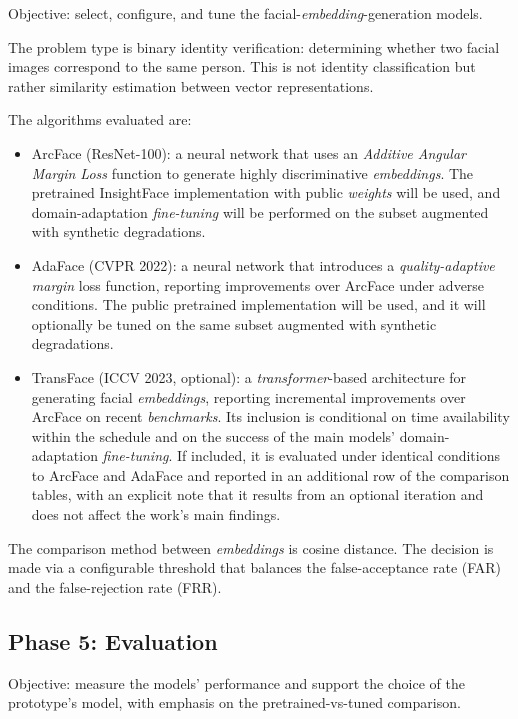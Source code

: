 \documentclass[
  11pt, %
]{charter}
\begin{document}
Objective: select, configure, and tune the facial-\textit{embedding}-generation models.

The problem type is binary identity verification: determining whether two facial images correspond to the same person. This is not identity classification but rather similarity estimation between vector representations.

The algorithms evaluated are:

\begin{itemize}
  \item ArcFace (ResNet-100): a neural network that uses an \textit{Additive Angular Margin Loss} function to generate highly discriminative \textit{embeddings}. The pretrained InsightFace implementation with public \textit{weights} will be used, and domain-adaptation \textit{fine-tuning} will be performed on the subset augmented with synthetic degradations.
  \item AdaFace (CVPR 2022): a neural network that introduces a \textit{quality-adaptive margin} loss function, reporting improvements over ArcFace under adverse conditions. The public pretrained implementation will be used, and it will optionally be tuned on the same subset augmented with synthetic degradations.
  \item TransFace (ICCV 2023, optional): a \textit{transformer}-based architecture for generating facial \textit{embeddings}, reporting incremental improvements over ArcFace on recent \textit{benchmarks}. Its inclusion is conditional on time availability within the schedule and on the success of the main models' domain-adaptation \textit{fine-tuning}. If included, it is evaluated under identical conditions to ArcFace and AdaFace and reported in an additional row of the comparison tables, with an explicit note that it results from an optional iteration and does not affect the work's main findings.
\end{itemize}

The comparison method between \textit{embeddings} is cosine distance. The decision is made via a configurable threshold that balances the false-acceptance rate (FAR) and the false-rejection rate (FRR).

\subsection{Phase 5: Evaluation}

Objective: measure the models' performance and support the choice of the prototype's model, with emphasis on the pretrained-vs-tuned comparison.
\end{document}
